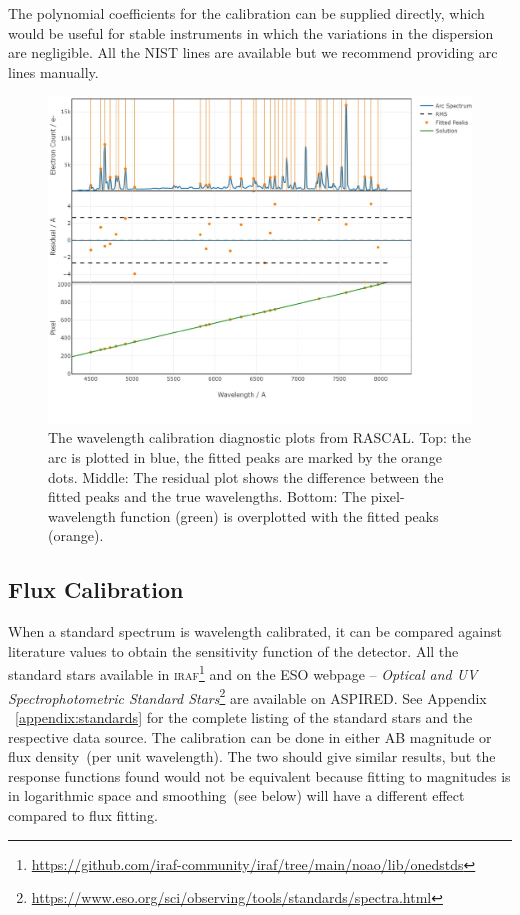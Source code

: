 \documentclass[twocolumn, linenumbers]{aastex631}
\begin{document}
The polynomial coefficients for the calibration can be supplied
directly, which would be useful for stable instruments in which
the variations in the dispersion are negligible. All the NIST lines
are available but we recommend providing arc lines manually.

\begin{figure}
    \centering
    \includegraphics[width=\columnwidth]{fig_05_wavelength_calibration_diagnostics.pdf}
    \caption{The wavelength calibration diagnostic plots from RASCAL.
    Top: the arc is plotted in blue, the fitted peaks are marked by
    the orange dots. Middle: The residual plot shows the difference
    between the fitted peaks and the true wavelengths. Bottom: The
    pixel-wavelength function (green) is overplotted with the fitted
    peaks (orange).}
    \label{fig:wavecal}
\end{figure}

\subsection{Flux Calibration}
When a standard spectrum is wavelength calibrated, it can be
compared against literature values to obtain the sensitivity
function of the detector. All the standard stars available in
\textsc{iraf}\footnote{\url{https://github.com/iraf-community/iraf/tree/main/noao/lib/onedstds}}
and on the ESO webpage -- \textit{Optical and UV Spectrophotometric
Standard Stars}\footnote{\url{https://www.eso.org/sci/observing/tools/standards/spectra.html}}
are available on \textsc{ASPIRED}. See Appendix ~\ref{appendix:standards} for
the complete listing of the standard stars and the respective data
source. The calibration can be done in either AB magnitude or
flux density~(per unit wavelength). The two should give similar
results, but the response functions found would not be equivalent
because fitting to magnitudes is in logarithmic space and smoothing~(see
below) will have a different effect compared to flux fitting.
\end{document}
